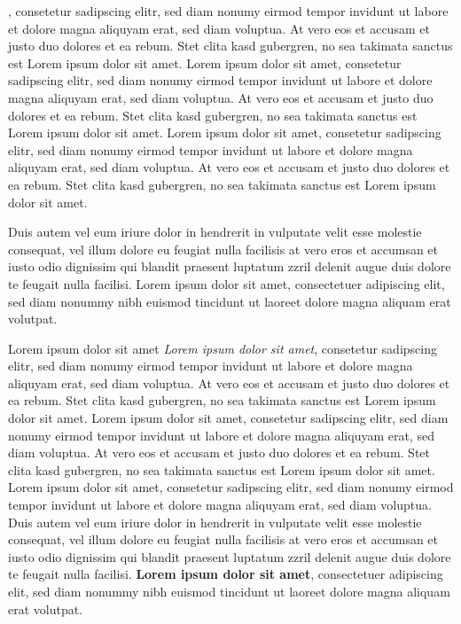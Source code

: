\documentclass[10pt,twoside,twocolumn,openany,nodeprecatedcode]{dndbook}
\begin{document}
, consetetur sadipscing elitr, sed diam nonumy eirmod tempor invidunt ut labore et dolore magna aliquyam erat, sed diam voluptua. At vero eos et accusam et justo duo dolores et ea rebum. Stet clita kasd gubergren, no sea takimata sanctus est Lorem ipsum dolor sit amet. Lorem ipsum dolor sit amet, consetetur sadipscing elitr, sed diam nonumy eirmod tempor invidunt ut labore et dolore magna aliquyam erat, sed diam voluptua. At vero eos et accusam et justo duo dolores et ea rebum. Stet clita kasd gubergren, no sea takimata sanctus est Lorem ipsum dolor sit amet. Lorem ipsum dolor sit amet, consetetur sadipscing elitr, sed diam nonumy eirmod tempor invidunt ut labore et dolore magna aliquyam erat, sed diam voluptua. At vero eos et accusam et justo duo dolores et ea rebum. Stet clita kasd gubergren, no sea takimata sanctus est Lorem ipsum dolor sit amet.

Duis autem vel eum iriure dolor in hendrerit in vulputate velit esse molestie consequat, vel illum dolore eu feugiat nulla facilisis at vero eros et accumsan et iusto odio dignissim qui blandit praesent luptatum zzril delenit augue duis dolore te feugait nulla facilisi. Lorem ipsum dolor sit amet, consectetuer adipiscing elit, sed diam nonummy nibh euismod tincidunt ut laoreet dolore magna aliquam erat volutpat.
\begin{DndReadAloud}{Lorem ipsum dolor sit amet}
\textit{Lorem ipsum dolor sit amet}, consetetur sadipscing elitr, sed diam nonumy eirmod tempor invidunt ut labore et dolore magna aliquyam erat, sed diam voluptua. At vero eos et accusam et justo duo dolores et ea rebum. Stet clita kasd gubergren, no sea takimata sanctus est Lorem ipsum dolor sit amet. Lorem ipsum dolor sit amet, consetetur sadipscing elitr, sed diam nonumy eirmod tempor invidunt ut labore et dolore magna aliquyam erat, sed diam voluptua. At vero eos et accusam et justo duo dolores et ea rebum. Stet clita kasd gubergren, no sea takimata sanctus est Lorem ipsum dolor sit amet. Lorem ipsum dolor sit amet, consetetur sadipscing elitr, sed diam nonumy eirmod tempor invidunt ut labore et dolore magna aliquyam erat, sed diam voluptua.
Duis autem vel eum iriure dolor in hendrerit in vulputate velit esse molestie consequat, vel illum dolore eu feugiat nulla facilisis at vero eros et accumsan et iusto odio dignissim qui blandit praesent luptatum zzril delenit augue duis dolore te feugait nulla facilisi. \textbf{Lorem ipsum dolor sit amet}, consectetuer adipiscing elit, sed diam nonummy nibh euismod tincidunt ut laoreet dolore magna aliquam erat volutpat. 
\end{DndReadAloud}
\end{document}
